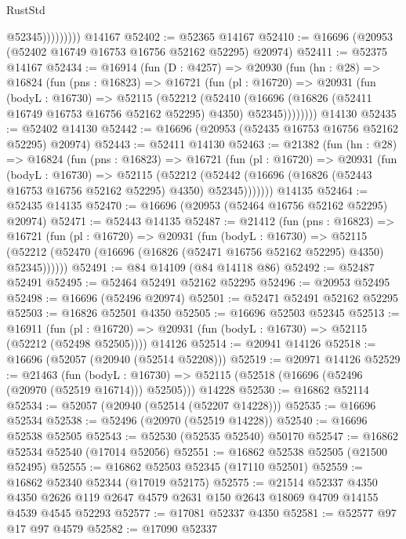 \begin{lexlean}{RustStd}
\begin{coremodule}
                      @52345)))))))))
    @14167
@52402 := @52365 @14167
@52410 := @16696 (@20953 (@52402 @16749 @16753 @16756 @52162 @52295) @20974)
@52411 := @52375 @14167
@52434 := @16914
    (fun (D : @4257) =>
    @20930
      (fun (hn : @28) =>
      @16824
        (fun (pns : @16823) =>
        @16721
          (fun (pl : @16720) =>
          @20931
            (fun (bodyL : @16730) =>
            @52115
              (@52212
                (@52410
                  (@16696 (@16826 (@52411 @16749 @16753 @16756 @52162 @52295) @4350) @52345))))))))
    @14130
@52435 := @52402 @14130
@52442 := @16696 (@20953 (@52435 @16753 @16756 @52162 @52295) @20974)
@52443 := @52411 @14130
@52463 := @21382
    (fun (hn : @28) =>
    @16824
      (fun (pns : @16823) =>
      @16721
        (fun (pl : @16720) =>
        @20931
          (fun (bodyL : @16730) =>
          @52115
            (@52212
              (@52442 (@16696 (@16826 (@52443 @16753 @16756 @52162 @52295) @4350) @52345)))))))
    @14135
@52464 := @52435 @14135
@52470 := @16696 (@20953 (@52464 @16756 @52162 @52295) @20974)
@52471 := @52443 @14135
@52487 := @21412
    (fun (pns : @16823) =>
    @16721
      (fun (pl : @16720) =>
      @20931
        (fun (bodyL : @16730) =>
        @52115 (@52212 (@52470 (@16696 (@16826 (@52471 @16756 @52162 @52295) @4350) @52345))))))
@52491 := @84 @14109 (@84 @14118 @86)
@52492 := @52487 @52491
@52495 := @52464 @52491 @52162 @52295
@52496 := @20953 @52495
@52498 := @16696 (@52496 @20974)
@52501 := @52471 @52491 @52162 @52295
@52503 := @16826 @52501 @4350
@52505 := @16696 @52503 @52345
@52513 := @16911
    (fun (pl : @16720) => @20931 (fun (bodyL : @16730) => @52115 (@52212 (@52498 @52505))))
    @14126
@52514 := @20941 @14126
@52518 := @16696 (@52057 (@20940 (@52514 @52208)))
@52519 := @20971 @14126
@52529 := @21463
    (fun (bodyL : @16730) => @52115 (@52518 (@16696 (@52496 (@20970 (@52519 @16714))) @52505)))
    @14228
@52530 := @16862 @52114
@52534 := @52057 (@20940 (@52514 (@52207 @14228)))
@52535 := @16696 @52534
@52538 := @52496 (@20970 (@52519 @14228))
@52540 := @16696 @52538 @52505
@52543 := @52530 (@52535 @52540) @50170
@52547 := @16862 @52534 @52540 (@17014 @52056)
@52551 := @16862 @52538 @52505 (@21500 @52495)
@52555 := @16862 @52503 @52345 (@17110 @52501)
@52559 := @16862 @52340 @52344 (@17019 @52175)
@52575 := @21514
    @52337
    @4350
    @4350
    @2626
    @119
    @2647
    @4579
    @2631
    @150
    @2643
    @18069
    @4709
    @14155
    @4539
    @4545
    @52293
@52577 := @17081 @52337 @4350
@52581 := @52577 @97 @17 @97 @4579
@52582 := @17090 @52337

\end{coremodule}
\end{lexlean}
